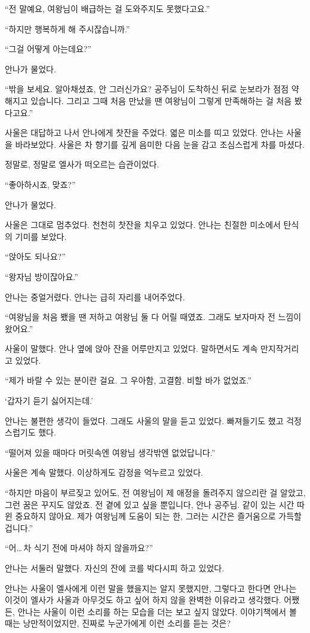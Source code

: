 ``전 말예요, 여왕님이 배급하는 걸 도와주지도 못했다고요.''

``하지만 행복하게 해 주시잖습니까.''

``그걸 어떻게 아는데요?''

안나가 물었다.

``밖을 보세요. 알아채셨죠, 안 그러신가요? 공주님이 도착하신 뒤로 눈보라가 점점 약해지고 있습니다. 그리고 그때 처음 만났을 땐 여왕님이 그렇게 만족해하는 걸 처음 봤다고요.''

사울은 대답하고 나서 안나에게 찻잔을 주었다. 엷은 미소를 띠고 있었다. 안나는 사울을 바라보았다. 사울은 차 향기를 깊게 음미한 다음 눈을 감고 조심스럽게 차를 마셨다.

정말로, 정말로 엘사가 떠오르는 습관이었다.

`` 좋아하시죠, 맞죠?''

안나가 물었다.

사울은 그대로 멈추었다. 천천히 찻잔을 치우고 있었다. 안나는 친절한 미소에서 탄식의 기미를 보았다.

``앉아도 되나요?''

``왕자님 방이잖아요.''

안나는 중얼거렸다. 안나는 급히 자리를 내어주었다.

``여왕님을 처음 뵀을 땐 저하고 여왕님 둘 다 어릴 때였죠. 그래도 보자마자 전 느낌이 왔어요.''

사울이 말했다. 안나 옆에 앉아 잔을 어루만지고 있었다. 말하면서도 계속 만지작거리고 있었다.

``제가 바랄 수 있는 분이란 걸요. 그 우아함, 고결함. 비할 바가 없었죠.''

`갑자기 듣기 싫어지는데.'

안나는 불편한 생각이 들었다. 그래도 사울의 말을 듣고 있었다. 빠져들기도 했고 걱정스럽기도 했다.

``떨어져 있을 때마다 머릿속엔 여왕님 생각밖엔 없었답니다.''

사울은 계속 말했다. 이상하게도 감정을 억누르고 있었다.

``하지만 마음이 부르짖고 있어도, 전 여왕님이 제 애정을 돌려주지 않으리란 걸 알았고, 그런 꿈은 꾸지도 않았죠. 전 곁에 있고 싶을 뿐입니다, 안나 공주님. 같이 있는 시간 따윈 중요하지 않아요. 제가 여왕님께 도움이 되는 한, 그러는 시간은 즐거움으로 가득할 겁니다.''

``어\ldots\,차 식기 전에 마셔야 하지 않을까요?''

안나는 서둘러 말했다. 자신의 잔에 코를 박다시피 하고 있었다.

안나는 사울이 엘사에게 이런 말을 했을지는 알지 못했지만, 그렇다고 한다면 안나는 이것이 엘사가 사울과 아무것도 하고 싶어 하지 않을 완벽한 이유라고 생각했다. 어쨌든, 안나는 사울이 이런 소리를 하는 모습을 더는 보고 싶지 않았다. 이야기책에서 볼 때는 낭만적이었지만, 진짜로 누군가에게 이런 소리를 듣는 것은?

